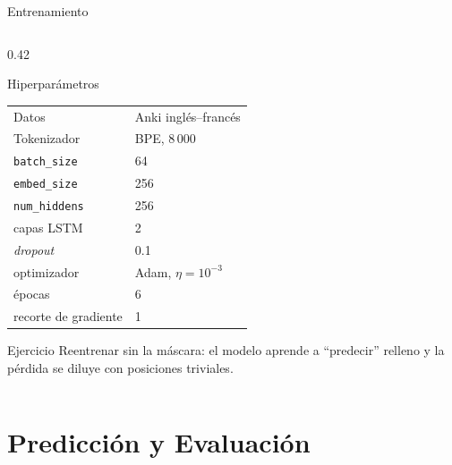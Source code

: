 \documentclass[aspectratio=169, 10pt]{beamer}
\begin{document}
\begin{frame}[fragile]{Entrenamiento}
\begin{columns}[T]
		\begin{column}{0.42\textwidth}
			\begin{block}{Hiperpar\'ametros}
				\small
				\begin{tabular}{@{}ll@{}}
					\toprule
					Datos & Anki ingl\'es--franc\'es \\
Tokenizador & BPE, 8\,000 \\
					\texttt{batch\_size} & 64 \\
					\texttt{embed\_size} & 256 \\
					\texttt{num\_hiddens} & 256 \\
					capas LSTM & 2 \\
					\emph{dropout} & 0.1 \\
					optimizador & Adam, $\eta=10^{-3}$ \\
					\'epocas & 6 \\
					recorte de gradiente & 1 \\
					\bottomrule
				\end{tabular}
			\end{block}
			\begin{alertblock}{Ejercicio}
				\small
				Reentrenar sin la m\'ascara: el modelo aprende a ``predecir'' relleno y la p\'erdida se diluye con posiciones triviales.
			\end{alertblock}
		\end{column}
	\end{columns}

\end{frame}

\section{Predicci\'on y Evaluaci\'on}
\end{document}
